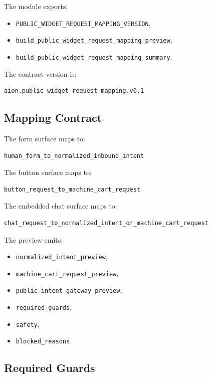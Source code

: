 The module exports:

\begin{itemize}
  \item \texttt{PUBLIC\_WIDGET\_REQUEST\_MAPPING\_VERSION},
  \item \texttt{build\_public\_widget\_request\_mapping\_preview},
  \item \texttt{build\_public\_widget\_request\_mapping\_summary}.
\end{itemize}

The contract version is:

\begin{verbatim}
aion.public_widget_request_mapping.v0.1
\end{verbatim}

\subsection{Mapping Contract}

The form surface maps to:

\begin{verbatim}
human_form_to_normalized_inbound_intent
\end{verbatim}

The button surface maps to:

\begin{verbatim}
button_request_to_machine_cart_request
\end{verbatim}

The embedded chat surface maps to:

\begin{verbatim}
chat_request_to_normalized_intent_or_machine_cart_request
\end{verbatim}

The preview emits:

\begin{itemize}
  \item \texttt{normalized\_intent\_preview},
  \item \texttt{machine\_cart\_request\_preview},
  \item \texttt{public\_intent\_gateway\_preview},
  \item \texttt{required\_guards},
  \item \texttt{safety},
  \item \texttt{blocked\_reasons}.
\end{itemize}

\subsection{Required Guards}

